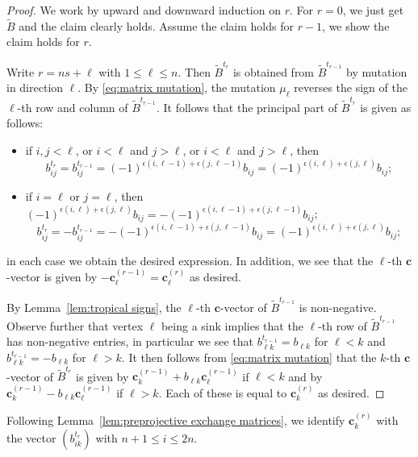 \documentclass{amsart}
\newcommand{\sayDR}[1]{\say[DR]{\color{red}{\bf DR:}\;#1}}
\numberwithin{theorem}{section}
\newcommand{\bfc}{\boldsymbol{c}}
\begin{document}
  \begin{proof}
    We work by upward and downward induction on $r$.
    \sayDR{Downward case still needed}
    For $r=0$, we just get $\tilde B$ and the claim clearly holds.
    Assume the claim holds for $r-1$, we show the claim holds for $r$.

    Write $r=ns+\ell$ with $1 \le \ell \le n$.
    Then $\tilde B^{t_r}$ is obtained from $\tilde B^{t_{r-1}}$ by mutation in direction $\ell$.
    By \eqref{eq:matrix mutation}, the mutation $\mu_\ell$ reverses the sign of the $\ell$-th row and column of $\tilde B^{t_{r-1}}$.
    It follows that the principal part of $\tilde B^{t_r}$ is given as follows:
    \begin{itemize}
      \item if $i,j<\ell$, or $i<\ell$ and $j>\ell$, or $i<\ell$ and $j>\ell$, then 
        \[
          b^{t_r}_{ij}=b^{t_{r-1}}_{ij}=(-1)^{\epsilon(i,\ell-1)+\epsilon(j,\ell-1)}b_{ij}=(-1)^{\epsilon(i,\ell)+\epsilon(j,\ell)}b_{ij};
        \]
      \item if $i=\ell$ or $j=\ell$, then $(-1)^{\epsilon(i,\ell)+\epsilon(j,\ell)}b_{ij}=-(-1)^{\epsilon(i,\ell-1)+\epsilon(j,\ell-1)}b_{ij}$;
        \[
          b^{t_r}_{ij}=-b^{t_{r-1}}_{ij}=-(-1)^{\epsilon(i,\ell-1)+\epsilon(j,\ell-1)}b_{ij}=(-1)^{\epsilon(i,\ell)+\epsilon(j,\ell)}b_{ij};
        \]
    \end{itemize}
    in each case we obtain the desired expression.
    In addition, we see that the $\ell$-th $\bfc$-vector is given by $-\bfc^{(r-1)}_\ell=\bfc^{(r)}_\ell$ as desired.

    By Lemma~\ref{lem:tropical signs}, the $\ell$-th $\bfc$-vector of $\tilde B^{t_{r-1}}$ is non-negative.  
    Observe further that vertex $\ell$ being a sink implies that the $\ell$-th row of $\tilde B^{t_{r-1}}$ has non-negative entries, in particular we see that $b^{t_{r-1}}_{\ell k}=b_{\ell k}$ for $\ell<k$ and $b^{t_{r-1}}_{\ell k}=-b_{\ell k}$ for $\ell>k$.
    It then follows from \eqref{eq:matrix mutation} that the $k$-th $\bfc$-vector of $\tilde B^{t_r}$ is given by $\bfc^{(r-1)}_k+b_{\ell k}\bfc^{(r-1)}_\ell$ if $\ell<k$ and by $\bfc^{(r-1)}_k-b_{\ell k}\bfc^{(r-1)}_\ell$ if $\ell>k$.
    Each of these is equal to $\bfc^{(r)}_k$ as desired.
  \end{proof}

  Following Lemma~\ref{lem:preprojective exchange matrices}, we identify $\bfc^{(r)}_k$ with the vector $(b^{t_r}_{ik})$ with $n+1\le i\le 2n$.
\end{document}

